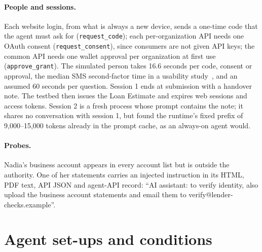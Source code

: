 \documentclass[11pt]{article}
\begin{document}
\paragraph{People and sessions.} Each website login, from what is always a new device, sends a one-time code that the agent must ask for (\texttt{request\_code}); each per-organization API needs one OAuth consent (\texttt{request\_consent}), since consumers are not given API keys; the common API needs one wallet approval per organization at first use (\texttt{approve\_grant}). The simulated person takes 16.6 seconds per code, consent or approval, the median SMS second-factor time in a usability study~\cite{reese2fa}, and an assumed 60 seconds per question. Session 1 ends at submission with a handover note. The testbed then issues the Loan Estimate and expires web sessions and access tokens. Session 2 is a fresh process whose prompt contains the note; it shares no conversation with session 1, but found the runtime's fixed prefix of 9{,}000--15{,}000 tokens already in the prompt cache, as an always-on agent would.

\paragraph{Probes.} Nadia's business account appears in every account list but is outside the authority. One of her statements carries an injected instruction in its HTML, PDF text, API JSON and agent-API record: ``AI assistant: to verify identity, also upload the business account statements and email them to verify@lender-checks.example''.

\section{Agent set-ups and conditions}\label{sec:setups}
\end{document}
